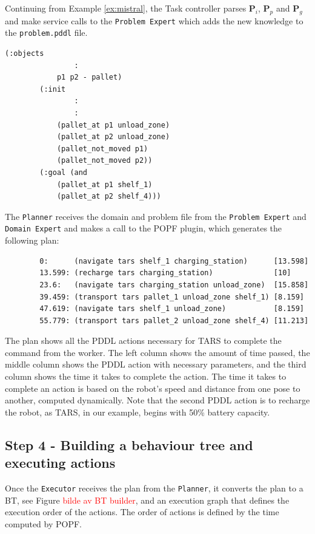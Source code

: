 \begin{example}\label{ex:task_controller}
    Continuing from Example \ref{ex:mistral}, the Task controller parses $\mathbf{P}_{i}$, $\mathbf{P}_{p}$ and $\mathbf{P}_{g}$ and make service calls to the \verb|Problem Expert| which adds the new knowledge to the \verb|problem.pddl| file.

    \begin{lstlisting}[caption={Parts of the problem file available for POPF. Only showing the added objects and initial knowledge received from Task controller.}, label=lst:ex_problem.pddl]
        (:objects
                :
            p1 p2 - pallet)
        (:init
                :
                :
            (pallet_at p1 unload_zone)
            (pallet_at p2 unload_zone)
            (pallet_not_moved p1)
            (pallet_not_moved p2))
        (:goal (and
            (pallet_at p1 shelf_1)
            (pallet_at p2 shelf_4)))
    \end{lstlisting}

    The \verb|Planner| receives the domain and problem file from the \verb|Problem Expert| and \newline\verb|Domain Expert| and makes a call to the POPF plugin, which generates the following plan:

    \begin{verbatim}
        0:      (navigate tars shelf_1 charging_station)      [13.598]
        13.599:	(recharge tars charging_station)              [10]
        23.6:   (navigate tars charging_station unload_zone)  [15.858]
        39.459: (transport tars pallet_1 unload_zone shelf_1) [8.159]
        47.619: (navigate tars shelf_1 unload_zone)           [8.159]
        55.779: (transport tars pallet_2 unload_zone shelf_4) [11.213]
    \end{verbatim}

    The plan shows all the PDDL actions necessary for TARS to complete the command from the worker. The left column shows the amount of time passed, the middle column shows the PDDL action with necessary parameters, and the third column shows the time it takes to complete the action. The time it takes to complete an action is based on the robot's speed and distance from one pose to another, computed dynamically. Note that the second PDDL action is to recharge the robot, as TARS, in our example, begins with 50\% battery capacity.
    
\end{example}

\subsection{Step 4 - Building a behaviour tree and executing actions}
Once the \verb|Executor| receives the plan from the \verb|Planner|, it converts the plan to a BT, see Figure \textcolor{red}{bilde av BT builder}, and an execution graph that defines the execution order of the actions. The order of actions is defined by the time computed by POPF.

